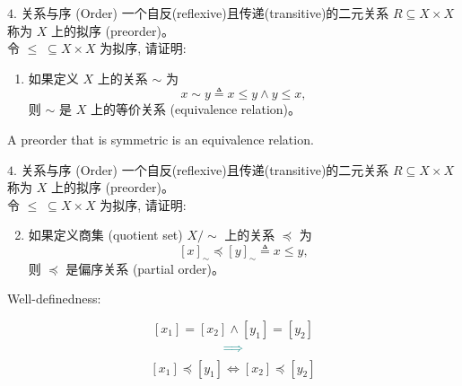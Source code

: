 \begin{frame}{}
  \begin{exampleblock}{$4.$ 关系与序 (Order)}
    一个自反(reflexive)且传递(transitive)的二元关系 $R \subseteq X \times X$ 称为 $X$ 上的拟序 (preorder)。\\[8pt]

    令 $\le \;\subseteq X \times X$ 为拟序, 请证明:
    \begin{enumerate}[(1)]
      \item 如果定义 $X$ 上的关系 $\sim$ 为
	\[
	  x \sim y \triangleq x \le y \land y \le x,
	\]
	则 $\sim$ 是 $X$ 上的等价关系 (equivalence relation)。
    \end{enumerate}
  \end{exampleblock}

  \pause
  \vspace{0.50cm}
  \centerline{A preorder that is symmetric is an equivalence relation.}
\end{frame}

\begin{frame}{}
  \begin{exampleblock}{$4.$ 关系与序 (Order)}
    一个自反(reflexive)且传递(transitive)的二元关系 $R \subseteq X \times X$ 称为 $X$ 上的拟序 (preorder)。\\[8pt]

    令 $\le \;\subseteq X \times X$ 为拟序, 请证明:
    \begin{enumerate}[(1)]
      \setcounter{enumi}{1}
      \item 如果定义商集 (quotient set) $X/\sim$ 上的关系 $\preceq$ 为
	\[
	  [x]_{\sim} \preceq [y]_{\sim} \triangleq x \le y,
	\]
	则 $\preceq$ 是偏序关系 (partial order)。
    \end{enumerate}
  \end{exampleblock}

  \pause
  \vspace{0.60cm}
  \centerline{}
\end{frame}

\begin{frame}{}
  \centerline{\large Well-definedness: }

  \pause
  \vspace{0.50cm}
  \[
    [x_1] = [x_2] \land [y_1] = [y_2]
  \]
  \[
    \textcolor{teal}{\implies}
  \]
  \[
    [x_1] \preceq [y_1] \iff [x_2] \preceq [y_2]
  \]
\end{frame}

\begin{frame}{}

  \pause
  \vspace{0.20cm}
  \centerline{}

  \pause
  \vspace{0.20cm}
\end{frame}
